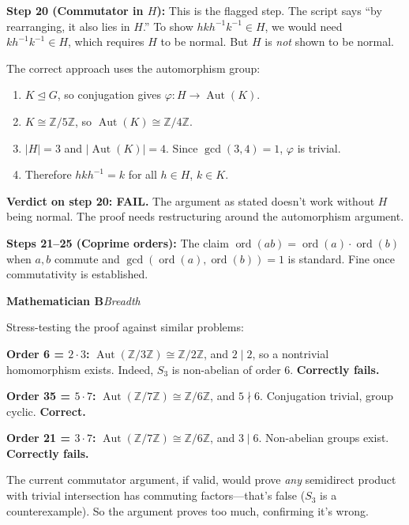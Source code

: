\documentclass[11pt]{article}
\newcommand{\agent}[3]{%
  \medskip\noindent
  \textcolor{#1}{\textbf{#2}}\hfill\textcolor{#1}{\textit{#3}}\par\smallskip
}
\begin{document}
\textbf{Step 20 (Commutator in $H$):} This is the flagged step. The script says ``by rearranging, it also lies in $H$.'' To show $hkh^{-1}k^{-1} \in H$, we would need $kh^{-1}k^{-1} \in H$, which requires $H$ to be normal. But $H$ is \emph{not} shown to be normal.

The correct approach uses the automorphism group:
\begin{enumerate}[nosep]
  \item $K \trianglelefteq G$, so conjugation gives $\varphi\colon H \to \operatorname{Aut}(K)$.
  \item $K \cong \mathbb{Z}/5\mathbb{Z}$, so $\operatorname{Aut}(K) \cong \mathbb{Z}/4\mathbb{Z}$.
  \item $|H|=3$ and $|\!\operatorname{Aut}(K)|=4$. Since $\gcd(3,4)=1$, $\varphi$ is trivial.
  \item Therefore $hkh^{-1}=k$ for all $h \in H$, $k \in K$.
\end{enumerate}

\textbf{Verdict on step 20: FAIL.} The argument as stated doesn't work without $H$ being normal. The proof needs restructuring around the automorphism argument.

\textbf{Steps 21--25 (Coprime orders):} The claim $\operatorname{ord}(ab) = \operatorname{ord}(a)\cdot\operatorname{ord}(b)$ when $a,b$ commute and $\gcd(\operatorname{ord}(a),\operatorname{ord}(b))=1$ is standard. Fine once commutativity is established.

\bigskip
\agent{breadthgreen}{Mathematician B}{Breadth}

Stress-testing the proof against similar problems:

\textbf{Order 6 = $2\cdot 3$:} $\operatorname{Aut}(\mathbb{Z}/3\mathbb{Z}) \cong \mathbb{Z}/2\mathbb{Z}$, and $2 \mid 2$, so a nontrivial homomorphism exists. Indeed, $S_3$ is non-abelian of order 6. \textbf{Correctly fails.}

\textbf{Order 35 = $5\cdot 7$:} $\operatorname{Aut}(\mathbb{Z}/7\mathbb{Z}) \cong \mathbb{Z}/6\mathbb{Z}$, and $5 \nmid 6$. Conjugation trivial, group cyclic. \textbf{Correct.}

\textbf{Order 21 = $3\cdot 7$:} $\operatorname{Aut}(\mathbb{Z}/7\mathbb{Z}) \cong \mathbb{Z}/6\mathbb{Z}$, and $3 \mid 6$. Non-abelian groups exist. \textbf{Correctly fails.}

The current commutator argument, if valid, would prove \emph{any} semidirect product with trivial intersection has commuting factors---that's false ($S_3$ is a counterexample). So the argument proves too much, confirming it's wrong.
\end{document}
